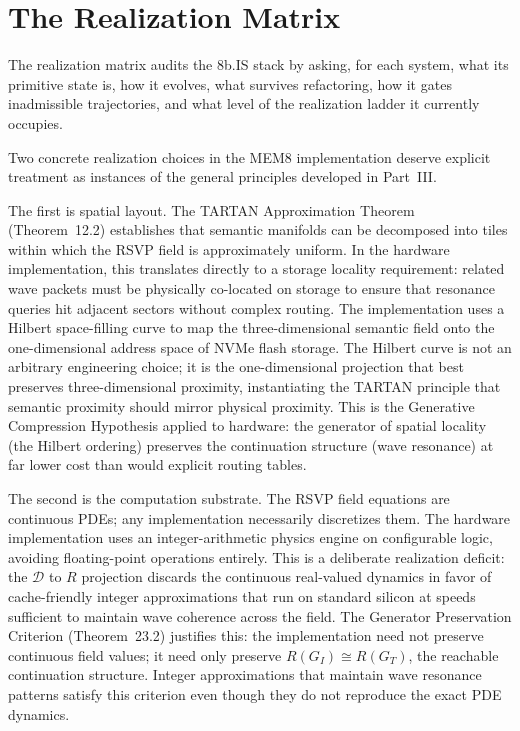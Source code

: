 \documentclass[12pt, oneside]{book}
\theoremstyle{flyxion}
\theoremstyle{definition}
\begin{document}
\section{The Realization Matrix}

The realization matrix audits the 8b.IS stack by
asking, for each system, what its primitive state is,
how it evolves, what survives refactoring, how it
gates inadmissible trajectories, and what level of
the realization ladder it currently occupies.

Two concrete realization choices in the MEM\textbar{}8
implementation deserve explicit treatment as instances
of the general principles developed in Part~III.

The first is spatial layout. The TARTAN Approximation
Theorem (Theorem~12.2) establishes that semantic
manifolds can be decomposed into tiles within which
the RSVP field is approximately uniform. In the
hardware implementation, this translates directly to
a storage locality requirement: related wave packets
must be physically co-located on storage to ensure
that resonance queries hit adjacent sectors without
complex routing. The implementation uses a Hilbert
space-filling curve to map the three-dimensional
semantic field onto the one-dimensional address space
of NVMe flash storage. The Hilbert curve is not an
arbitrary engineering choice; it is the one-dimensional
projection that best preserves three-dimensional
proximity, instantiating the TARTAN principle that
semantic proximity should mirror physical proximity.
This is the Generative Compression Hypothesis applied
to hardware: the generator of spatial locality (the
Hilbert ordering) preserves the continuation structure
(wave resonance) at far lower cost than would explicit
routing tables.

The second is the computation substrate. The RSVP
field equations are continuous PDEs; any implementation
necessarily discretizes them. The hardware
implementation uses an integer-arithmetic physics
engine on configurable logic, avoiding floating-point
operations entirely. This is a deliberate realization
deficit: the $\mathcal{D}$ to $R$ projection discards
the continuous real-valued dynamics in favor of
cache-friendly integer approximations that run on
standard silicon at speeds sufficient to maintain
wave coherence across the field. The Generator
Preservation Criterion (Theorem~23.2) justifies this:
the implementation need not preserve continuous field
values; it need only preserve $R(G_I) \cong R(G_T)$,
the reachable continuation structure. Integer
approximations that maintain wave resonance patterns
satisfy this criterion even though they do not
reproduce the exact PDE dynamics.
\end{document}
